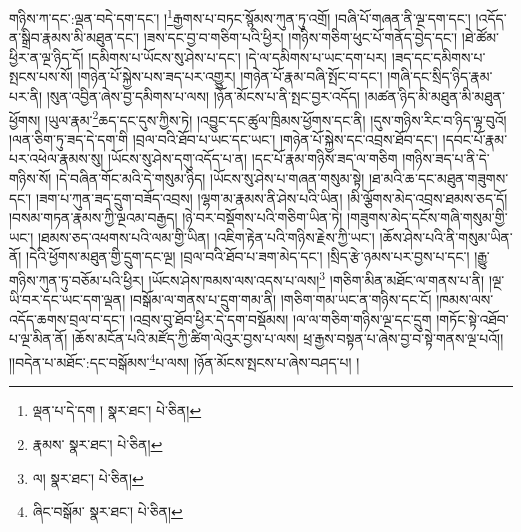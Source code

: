 གཉིས་ཀ་དང་:ལྡན་བདེ་དག་དང་། །\footnote{ལྡན་པ་དེ་དག །  སྣར་ཐང་།  པེ་ཅིན། }རྒྱགས་པ་བཏང་སྙོམས་ཀུན་ཏུ་འགྲོ། །བཞི་པོ་གཞན་ནི་ལྔ་དག་དང་། །འདོད་ན་སྒྲིབ་རྣམས་མི་མཐུན་དང་། །ཟས་དང་བྱ་བ་གཅིག་པའི་ཕྱིར། །གཉིས་གཅིག་ཕུང་པོ་གནོད་བྱེད་དང་། །ཐེ་ཚོམ་ཕྱིར་ན་ལྔ་ཉིད་དོ། །དམིགས་པ་ཡོངས་སུ་ཤེས་པ་དང་། །དེ་ལ་དམིགས་པ་ཡང་དག་པར། །ཟད་དང་དམིགས་པ་སྤངས་པས་སོ། །གཉེན་པོ་སྐྱེས་པས་ཟད་པར་འགྱུར། །གཉེན་པོ་རྣམ་བཞི་སྤོང་བ་དང་། །གཞི་དང་སྲིད་ཉིད་རྣམ་པར་ནི། །སུན་འབྱིན་ཞེས་བྱ་དམིགས་པ་ལས། །ཉོན་མོངས་པ་ནི་སྤང་བྱར་འདོད། །མཚན་ཉིད་མི་མཐུན་མི་མཐུན་ཕྱོགས། །ཡུལ་རྣམ་\footnote{རྣམས་  སྣར་ཐང་།  པེ་ཅིན། }ཆད་དང་དུས་ཀྱིས་ཏེ། །འབྱུང་དང་ཚུལ་ཁྲིམས་ཕྱོགས་དང་ནི། །དུས་གཉིས་རིང་བ་ཉིད་ལྟ་བུའོ། །ལན་ཅིག་ཏུ་ཟད་དེ་དག་གི །བྲལ་བའི་ཐོབ་པ་ཡང་དང་ཡང་། །གཉེན་པོ་སྐྱེས་དང་འབྲས་ཐོབ་དང་། །དབང་པོ་རྣམ་པར་འཕེལ་རྣམས་སུ། །ཡོངས་སུ་ཤེས་དགུ་འདོད་པ་ན། །དང་པོ་རྣམ་གཉིས་ཟད་ལ་གཅིག །གཉིས་ཟད་པ་ནི་དེ་གཉིས་སོ། །དེ་བཞིན་གོང་མའི་དེ་གསུམ་ཉིད། །ཡོངས་སུ་ཤེས་པ་གཞན་གསུམ་སྟེ། །ཐ་མའི་ཆ་དང་མཐུན་གཟུགས་དང་། །ཟག་པ་ཀུན་ཟད་དྲུག་བཟོད་འབྲས། །ལྷག་མ་རྣམས་ནི་ཤེས་པའི་ཡིན། །མི་ལྕོགས་མེད་འབྲས་ཐམས་ཅད་དོ། །བསམ་གཏན་རྣམས་ཀྱི་ལྔའམ་བརྒྱད། །ཉེ་བར་བསྡོགས་པའི་གཅིག་ཡིན་ཏེ། །གཟུགས་མེད་དངོས་གཞི་གསུམ་གྱི་ཡང་། །ཐམས་ཅད་འཕགས་པའི་ལམ་གྱི་ཡིན། །འཇིག་རྟེན་པའི་གཉིས་རྗེས་ཀྱི་ཡང་། །ཆོས་ཤེས་པའི་ནི་གསུམ་ཡིན་ནོ། །དེའི་ཕྱོགས་མཐུན་གྱི་དྲུག་དང་ལྔ། །བྲལ་བའི་ཐོབ་པ་ཟག་མེད་དང་། །སྲིད་རྩེ་ཉམས་པར་བྱས་པ་དང་། །རྒྱུ་གཉིས་ཀུན་ཏུ་བཅོམ་པའི་ཕྱིར། །ཡོངས་ཤེས་ཁམས་ལས་འདས་པ་ལས།\footnote{ལ།  སྣར་ཐང་།  པེ་ཅིན། } །གཅིག་མིན་མཐོང་ལ་གནས་པ་ནི། །ལྔ་ཡི་བར་དང་ཡང་དག་ལྡན། །བསྒོམ་ལ་གནས་པ་དྲུག་གམ་ནི། །གཅིག་གམ་ཡང་ན་གཉིས་དང་ངོ། །ཁམས་ལས་འདོད་ཆགས་བྲལ་བ་དང་། །འབྲས་བུ་ཐོབ་ཕྱིར་དེ་དག་བསྡོམས། །ལ་ལ་གཅིག་གཉིས་ལྔ་དང་དྲུག །གཏོང་སྟེ་འཐོབ་པ་ལྔ་མིན་ནོ། །ཆོས་མངོན་པའི་མཛོད་ཀྱི་ཚིག་ལེའུར་བྱས་པ་ལས། ཕྲ་རྒྱས་བསྟན་པ་ཞེས་བྱ་བ་སྟེ་གནས་ལྔ་པའོ།། །།བདེན་པ་མཐོང་:དང་བསྒོམས་\footnote{ཞིང་བསྒོམ་  སྣར་ཐང་།  པེ་ཅིན། }པ་ལས། །ཉོན་མོངས་སྤངས་པ་ཞེས་བཤད་པ། །

